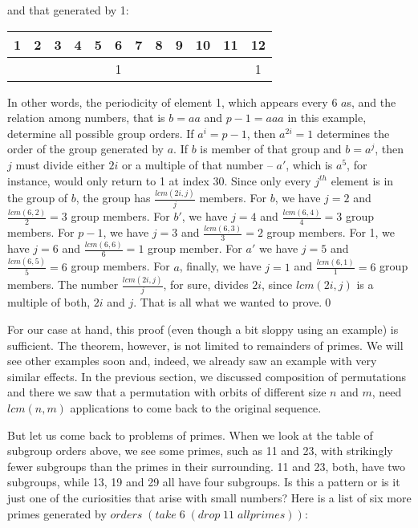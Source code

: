 \documentclass{scrreprt}
\newcommand{\Varid}[1]{\mathit{#1}}
\begin{document}
and that generated by 1:

\begin{center}
\begin{tabular}{|c|c|c|c|c|c|c|c|c|c|c|c}
 1 &  2 &  3 &  4 &  5 &  6 &  7 &  8 &  9 & 10 & 11 & 12 \\\hline
   &    &    &    &    &  1 &    &    &    &    &    &  1   
\end{tabular}
\end{center}

In other words, the periodicity of element 1,
which appears every 6 $a$s, and the relation
among numbers, that is $b=aa$ and $p-1=aaa$
in this example, determine all possible group orders.
If $a^i = p-1$, then $a^{2i} = 1$ determines the 
order of the group generated by $a$. 
If $b$ is member of that group and $b=a^j$, 
then $j$ must divide either $2i$ or a multiple of that number --
$a'$, which is $a^5$, for instance, would only return to 1
at index 30.
Since only every $j^{th}$ element is in the group of $b$,
the group has $\frac{lcm(2i,j)}{j}$ members. 
For $b$, we have $j=2$ and $\frac{lcm(6,2)}{2} = 3$
group members. For $b'$, we have $j=4$ and
$\frac{lcm(6,4)}{4} = 3$ group members.
For $p-1$, we have $j=3$ and
$\frac{lcm(6,3)}{3} = 2$ group members.
For 1, we have $j=6$ and
$\frac{lcm(6,6)}{6} = 1$ group member.
For $a'$ we have $j=5$ and
$\frac{lcm(6,5)}{5} = 6$ group members.
For $a$, finally, we have $j=1$ and
$\frac{lcm(6,1)}{1} = 6$ group members.
The number 
$\frac{lcm(2i,j)}{j}$, for sure,
divides $2i$, since $lcm(2i,j)$ is a multiple
of both, $2i$ and $j$.
That is all what we wanted to prove.\qed %

For our case at hand, 
this proof (even though a bit sloppy using an example)
is sufficient.
The theorem, however, is not limited to 
remainders of primes.
We will see other examples soon and, indeed,
we already saw an example with very similar
effects. In the previous section,
we discussed composition of permutations
and there we saw that a permutation
with orbits of different size $n$ and $m$,
need $lcm(n,m)$ applications to come
back to the original sequence.

But let us come back to problems of primes.
When we look at the table of subgroup orders above,
we see some primes, such as 11 and 23, with 
strikingly fewer subgroups than the primes
in their surrounding. 11 and 23, both, have
two subgroups, while 13, 19 and 29 all have
four subgroups. Is this a pattern or is it
just one of the curiosities that arise
with small numbers?
Here is a list of six more primes
generated by \ensuremath{\Varid{orders}\;(\Varid{take}\;\mathrm{6}\;(\Varid{drop}\;\mathrm{11}\;\Varid{allprimes}))}:
\end{document}
